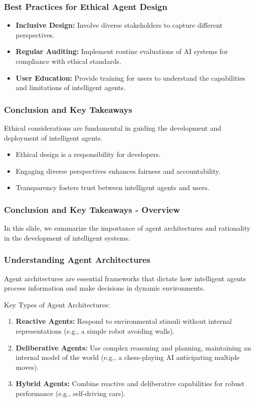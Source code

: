 \documentclass[aspectratio=169]{beamer}
\begin{document}
\begin{frame}[fragile]
  \frametitle{Best Practices for Ethical Agent Design}
  
  \begin{itemize}
    \item \textbf{Inclusive Design:} Involve diverse stakeholders to capture different perspectives.
    \item \textbf{Regular Auditing:} Implement routine evaluations of AI systems for compliance with ethical standards.
    \item \textbf{User Education:} Provide training for users to understand the capabilities and limitations of intelligent agents.
  \end{itemize}
  
\end{frame}

\begin{frame}[fragile]
  \frametitle{Conclusion and Key Takeaways}
  
  Ethical considerations are fundamental in guiding the development and deployment of intelligent agents. 

  \begin{itemize}
    \item Ethical design is a responsibility for developers.
    \item Engaging diverse perspectives enhances fairness and accountability.
    \item Transparency fosters trust between intelligent agents and users.
  \end{itemize}
  
\end{frame}

\begin{frame}[fragile]
    \frametitle{Conclusion and Key Takeaways - Overview}
    In this slide, we summarize the importance of agent architectures and rationality in the development of intelligent systems.
\end{frame}

\begin{frame}[fragile]
    \frametitle{Understanding Agent Architectures}
    Agent architectures are essential frameworks that dictate how intelligent agents process information and make decisions in dynamic environments. 

    \begin{block}{Key Types of Agent Architectures:}
        \begin{enumerate}
            \item \textbf{Reactive Agents:} Respond to environmental stimuli without internal representations (e.g., a simple robot avoiding walls).
            \item \textbf{Deliberative Agents:} Use complex reasoning and planning, maintaining an internal model of the world (e.g., a chess-playing AI anticipating multiple moves).
            \item \textbf{Hybrid Agents:} Combine reactive and deliberative capabilities for robust performance (e.g., self-driving cars).
        \end{enumerate}
    \end{block}
\end{frame}
\end{document}
